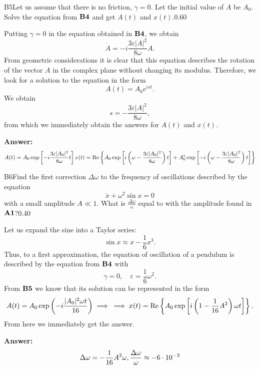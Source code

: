 \documentclass[11pt,a4paper]{article}
\begin{document}
\begin{solcard}{B5}{Let us assume that there is no friction, $\gamma = 0$. Let the initial value of $A$ be $A_0$. Solve the equation from $\bf B4$ and get $A(t)$ and $x(t)$.}{0.60}

Putting $\gamma=0$ in the equation obtained in $\bf B4$, we obtain \[\dot A=-i\frac{3\varepsilon|A|^2}{8\omega}A.\]From geometric considerations it is clear that this equation describes the rotation of the vector $A$ in the complex plane without changing its modulus. Therefore, we look for a solution to the equation in the form \[A(t)=A_0e^{ist}.\]We obtain \[s=-\frac{3\varepsilon|A|^2}{8\omega},\]from which we immediately obtain the answers for $A(t)$ and $x(t)$.

\par\smallskip\noindent\textbf{Answer:} \[A(t)=A_0\exp\left[-i\frac{3\varepsilon|A_0|^2}{8\omega}t\right]\\x(t)=\operatorname{Re}\left\{A_0\exp\left[i\left(\omega-\frac{3\varepsilon|A_0|^2}{8\omega}\right)t\right]+A^*_0\exp\left[-i\left(\omega-\frac{3\varepsilon|A_0|^2}{8\omega}\right)t\right]\right\}\]
\end{solcard}

\begin{solcard}{B6}{Find the first correction $\Delta \omega$ to the frequency of oscillations described by the equation \[ \ddot{x} + \omega^2 \sin x = 0 \] with a small amplitude $A \ll 1$. What is $\frac{\Delta \omega}{\omega}$ equal to with the amplitude found in $\bf A1$?}{0.40}

Let us expand the sine into a Taylor series:\[\sin x\approx x-\frac16x^3.\]Thus, to a first approximation, the equation of oscillation of a pendulum is described by the equation from $\bf B4$ with\[\gamma=0,\quad\varepsilon=\frac16\omega^2.\]From $\bf B5$ we know that its solution can be represented in the form\[A(t) = A_0 \exp \left(-i \frac{|A_0|^2 \omega t}{16}\right)\implies\\\implies x(t)=\operatorname{Re}\left\{A_0\exp\left[i\left(1-\frac{1}{16}A^2\right)\omega t\right]\right\}.\]From here we immediately get the answer.

\par\smallskip\noindent\textbf{Answer:} \[\Delta\omega=-\frac{1}{16}A^2\omega,\\\frac{\Delta\omega}\omega\approx -6\cdot 10^{-3}\]
\end{solcard}
\end{document}

